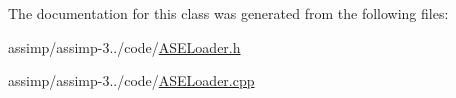 The documentation for this class was generated from the following files\+:\begin{DoxyCompactItemize}
\item 
assimp/assimp-\/3../code/\hyperlink{_a_s_e_loader_8h}{A\+S\+E\+Loader.\+h}\item 
assimp/assimp-\/3../code/\hyperlink{_a_s_e_loader_8cpp}{A\+S\+E\+Loader.\+cpp}\end{DoxyCompactItemize}
